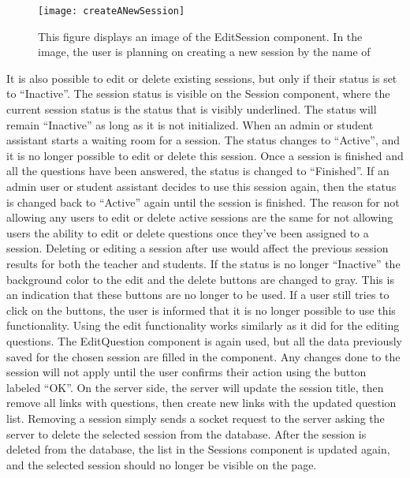 \begin{figure}[H]
    \texttt{[image: createANewSession]}
    \caption{This figure displays an image of the EditSession component. In the image, the user is planning on creating a new session by the name of %
    }
    \label{fig:editSessionComponent}
\end{figure}
\noindent
It is also possible to edit or delete existing sessions, but only if their status is set to “Inactive”. The session status is visible on the Session component, where the current session status is the status that is visibly underlined. The status will remain “Inactive” as long as it is not initialized. When an admin or student assistant starts a waiting room for a session. The status changes to “Active”, and it is no longer possible to edit or delete this session. Once a session is finished and all the questions have been answered, the status is changed to “Finished”. If an admin user or student assistant decides to use this session again, then the status is changed back to “Active” again until the session is finished. The reason for not allowing any users to edit or delete active sessions are the same for not allowing users the ability to edit or delete questions once they’ve been assigned to a session. Deleting or editing a session after use would affect the previous session results for both the teacher and students. If the status is no longer “Inactive” the background color to the edit and the delete buttons are changed to gray. This is an indication that these buttons are no longer to be used. If a user still tries to click on the buttons, the user is informed that it is no longer possible to use this functionality. Using the edit functionality works similarly as it did for the editing questions. The EditQuestion component is again used, but all the data previously saved for the chosen session are filled in the component. Any changes done to the session will not apply until the user confirms their action using the button labeled “OK”. On the server side, the server will update the session title, then remove all links with questions, then create new links with the updated question list. Removing a session simply sends a socket request to the server asking the server to delete the selected session from the database. After the session is deleted from the database, the list in the Sessions component is updated again, and the selected session should no longer be visible on the page.
